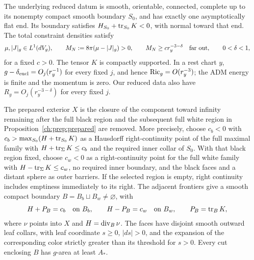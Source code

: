 \begin{definition}\label{ch:ell:prepared-neutral}
The underlying reduced datum is smooth, orientable, connected, complete
up to its nonempty compact smooth boundary $S_0$, and has exactly one
asymptotically flat end.  Its boundary satisfies
$H_{S_0}+\operatorname{tr}_{S_0}K<0$, with normal toward that end.  The total
constraint densities satisfy
\[
 \mu,|J|_g\in L^1(dV_g),\qquad
 M_N:=8\pi(\mu-|J|_g)>0,\qquad
 M_N\ge c r_y^{-3-\delta}\quad\hbox{far out},
 \qquad 0<\delta<1,
\]
for a fixed $c>0$.  The tensor $K$ is compactly supported.  In a rest
chart $y$, $g-\delta_{\rm eucl}=O_j(r_y^{-1})$ for every fixed $j$,
and hence $\operatorname{Ric}_g=O(r_y^{-3})$; the ADM energy is finite and the
momentum is zero.  Our reduced data also have
$R_g=O_j(r_y^{-3-\delta})$ for every fixed $j$.

The prepared exterior $X$ is the closure of the component toward
infinity remaining after the full black region and the subsequent full
white region in Proposition~\ref{ch:prep:prepared} are removed.  More
precisely, choose $c_b<0$ with
$c_b>\max_{S_0}(H+\operatorname{tr}_{S_0}K)$ as a Hausdorff right-continuity point
of the full maximal family with $H+\operatorname{tr}_\Sigma K\le c_b$ and the required
inner collar of $S_0$.  With that black region fixed, choose $c_w<0$
as a right-continuity point for the full white family with
$H-\operatorname{tr}_\Sigma K\le c_w$, no required inner boundary, and the black faces
and a distant sphere as outer barriers.  If the selected region is
empty, right continuity includes emptiness immediately to its right.
The adjacent frontiers give a smooth compact boundary
$B=B_b\sqcup B_w\ne\varnothing$, with
\begin{equation}\label{ch:ell:face-signs}
 H+P_B=c_b\quad\hbox{on }B_b,\qquad
 H-P_B=c_w\quad\hbox{on }B_w,
 \qquad P_B=\operatorname{tr}_BK,
\end{equation}
where $\nu$ points into $X$ and $H=\operatorname{div}_B\nu$.
The faces have disjoint smooth outward leaf collars, with leaf
coordinate $s\ge0$, $|ds|>0$, and the expansion of the corresponding
color strictly greater than its threshold for $s>0$.
Every cut enclosing $B$ has $g$-area at least $A_*$.


\end{definition}
